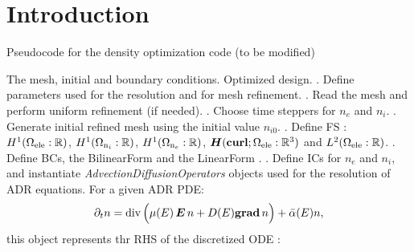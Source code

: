 \documentclass[review,hidelinks,onefignum,onetabnum]{siamart220329}
\begin{document}
\section{Introduction}
%
%
\lipsum[1-2]
%
%
\newpage
%
%
{
  \begin{center}
    \begin{algorithm}
      \small
      \caption{Pseudocode for the density optimization code (to be modified)}\label{alg:FE-Streamers}
      \begin{algorithmic}
        \INPUT The mesh, initial and boundary conditions.
        \OUTPUT Optimized design.
            . Define parameters used for the resolution and for mesh refinement.
            \vspace{2mm}
            . Read the mesh and perform uniform refinement (if needed).
            \vspace{2mm}
            . Choose time steppers for $n_e$ and $n_i$.
            \vspace{2mm}
            . Generate initial refined mesh using the initial value $n_{i 0}$.
            \vspace{2mm}
            . Define FS : $\Hone[]{\Omega_{\mathrm{ele}}:\mathbb{R}}$, $\Hone[]{\Omega_{\mathrm{n}_i}:\mathbb{R}}$, $\Hone[]{\Omega_{\mathrm{n}_e}:\mathbb{R}}$, $\Hcurl[]{\Omega_{\mathrm{ele}}:\mathbb{R}^3}$ and $\Ltwo[]{\Omega_{\mathrm{ele}}:\mathbb{R}}$.
            \vspace{2mm}
            . Define BCs, the BilinearForm and the LinearForm .
            \vspace{2mm}
            . Define ICs for $n_e$ and $n_i$, and instantiate \emph{AdvectionDiffusionOperators} objects used for the resolution of ADR equations. For a given ADR PDE:
            \begin{equation*}
              \partial_t n = \Div[]{\Big( \mu(E) \, \bEE \, n + D(E) \Grad[]{n} \Big)} + \bar{\alpha}(E) n,
            \end{equation*}
            this object represents thr RHS of the discretized ODE 
            :
            \begin{equation*}

\end{equation*}
\end{algorithmic}
\end{algorithm}
\end{center}}
\end{document}
